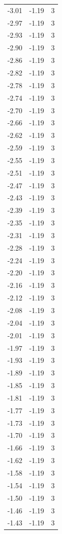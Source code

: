 \begin{longtable}{lrr}
  -3.01 & -1.19 & 3 \\
  -2.97 & -1.19 & 3 \\
  -2.93 & -1.19 & 3 \\
  -2.90 & -1.19 & 3 \\
  -2.86 & -1.19 & 3 \\
  -2.82 & -1.19 & 3 \\
  -2.78 & -1.19 & 3 \\
  -2.74 & -1.19 & 3 \\
  -2.70 & -1.19 & 3 \\
  -2.66 & -1.19 & 3 \\
  -2.62 & -1.19 & 3 \\
  -2.59 & -1.19 & 3 \\
  -2.55 & -1.19 & 3 \\
  -2.51 & -1.19 & 3 \\
  -2.47 & -1.19 & 3 \\
  -2.43 & -1.19 & 3 \\
  -2.39 & -1.19 & 3 \\
  -2.35 & -1.19 & 3 \\
  -2.31 & -1.19 & 3 \\
  -2.28 & -1.19 & 3 \\
  -2.24 & -1.19 & 3 \\
  -2.20 & -1.19 & 3 \\
  -2.16 & -1.19 & 3 \\
  -2.12 & -1.19 & 3 \\
  -2.08 & -1.19 & 3 \\
  -2.04 & -1.19 & 3 \\
  -2.01 & -1.19 & 3 \\
  -1.97 & -1.19 & 3 \\
  -1.93 & -1.19 & 3 \\
  -1.89 & -1.19 & 3 \\
  -1.85 & -1.19 & 3 \\
  -1.81 & -1.19 & 3 \\
  -1.77 & -1.19 & 3 \\
  -1.73 & -1.19 & 3 \\
  -1.70 & -1.19 & 3 \\
  -1.66 & -1.19 & 3 \\
  -1.62 & -1.19 & 3 \\
  -1.58 & -1.19 & 3 \\
  -1.54 & -1.19 & 3 \\
  -1.50 & -1.19 & 3 \\
  -1.46 & -1.19 & 3 \\
  -1.43 & -1.19 & 3 \\

\end{longtable}
